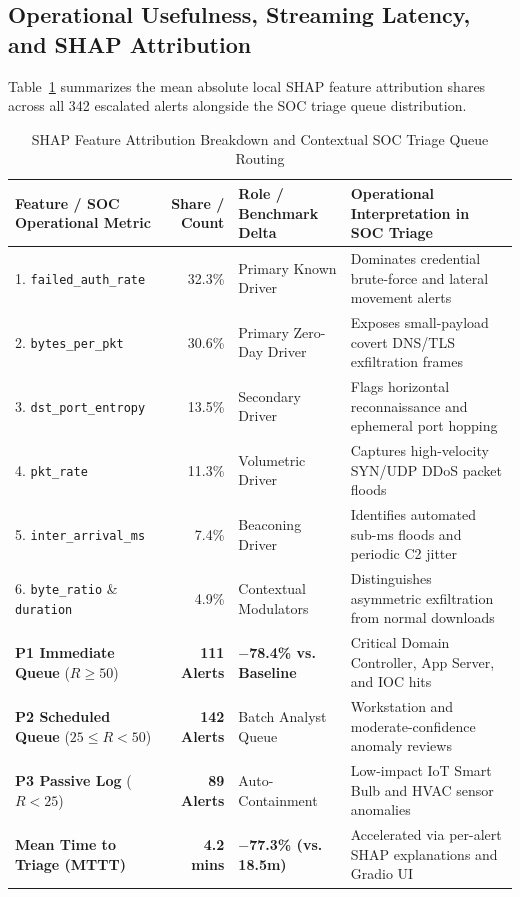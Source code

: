 \documentclass[10pt,a4paper]{article}
\begin{document}
\subsection{Operational Usefulness, Streaming Latency, and SHAP Attribution}
Table~\ref{tab:shap} summarizes the mean absolute local SHAP feature attribution shares across all 342 escalated alerts alongside the SOC triage queue distribution.

\begin{table}[htbp]
\centering
\caption{SHAP Feature Attribution Breakdown and Contextual SOC Triage Queue Routing}
\label{tab:shap}
\footnotesize
\renewcommand{\arraystretch}{1.22}
\begin{tabularx}{\textwidth}{l r l >{\raggedright\arraybackslash}X}
\toprule
\textbf{Feature / SOC Operational Metric} & \textbf{Share / Count} & \textbf{Role / Benchmark Delta} & \textbf{Operational Interpretation in SOC Triage} \\
\midrule
1. \texttt{failed\_auth\_rate} & 32.3\% & Primary Known Driver & Dominates credential brute-force and lateral movement alerts \\
2. \texttt{bytes\_per\_pkt} & 30.6\% & Primary Zero-Day Driver & Exposes small-payload covert DNS/TLS exfiltration frames \\
3. \texttt{dst\_port\_entropy} & 13.5\% & Secondary Driver & Flags horizontal reconnaissance and ephemeral port hopping \\
4. \texttt{pkt\_rate} & 11.3\% & Volumetric Driver & Captures high-velocity SYN/UDP DDoS packet floods \\
5. \texttt{inter\_arrival\_ms} & 7.4\% & Beaconing Driver & Identifies automated sub-ms floods and periodic C2 jitter \\
6. \texttt{byte\_ratio} \& \texttt{duration} & 4.9\% & Contextual Modulators & Distinguishes asymmetric exfiltration from normal downloads \\
\midrule
\textbf{P1 Immediate Queue} ($R \ge 50$) & \textbf{111 Alerts} & \textbf{$-$78.4\% vs. Baseline} & Critical Domain Controller, App Server, and IOC hits \\
\textbf{P2 Scheduled Queue} ($25 \le R < 50$) & \textbf{142 Alerts} & Batch Analyst Queue & Workstation and moderate-confidence anomaly reviews \\
\textbf{P3 Passive Log} ($R < 25$) & \textbf{89 Alerts} & Auto-Containment & Low-impact IoT Smart Bulb and HVAC sensor anomalies \\
\textbf{Mean Time to Triage (MTTT)} & \textbf{4.2 mins} & \textbf{$-$77.3\% (vs. 18.5m)} & Accelerated via per-alert SHAP explanations and Gradio UI \cite{gradio} \\
\bottomrule
\end{tabularx}
\end{table}
\end{document}
